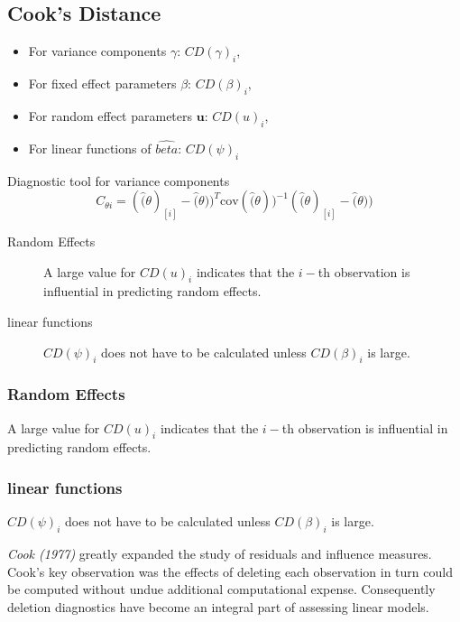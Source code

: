 \documentclass[12pt, a4paper]{report}
\theoremstyle{plain}
\theoremstyle{definition}
\theoremstyle{remark}
\begin{document}
		\subsection{Cook's Distance}
		\begin{itemize}
			\item For variance components $\gamma$: $CD(\gamma)_i$,
			\item For fixed effect parameters $\beta$: $CD(\beta)_i$,
			\item For random effect parameters $\boldsymbol{u}$: $CD(u)_i$,
			\item For linear functions of $\hat{beta}$: $CD(\psi)_i$
		\end{itemize}
		Diagnostic tool for variance components
		\[ C_{\theta i} =(\hat(\theta)_{[i]} - \hat(\theta))^{T}\mbox{cov}( \hat(\theta))^{-1}(\hat(\theta)_{[i]} - \hat(\theta))\]
		
		\begin{description}
			\item[Random Effects]	
			A large value for $CD(u)_i$ indicates that the $i-$th observation is influential in predicting random effects.
			\item[linear functions]
			$CD(\psi)_i$ does not have to be calculated unless $CD(\beta)_i$ is large.
		\end{description}
		


		
\subsubsection{Random Effects}

A large value for $CD(u)_i$ indicates that the $i-$th observation is influential in predicting random effects.

	
\subsubsection{linear functions}

$CD(\psi)_i$ does not have to be calculated unless $CD(\beta)_i$ is large.


%	
%	
\textit{Cook (1977)} greatly expanded the study of residuals and influence measures. Cook's key observation was the effects of deleting each observation in turn could be computed without undue additional computational expense. Consequently deletion diagnostics have become an integral part of assessing linear models.
\end{document}

